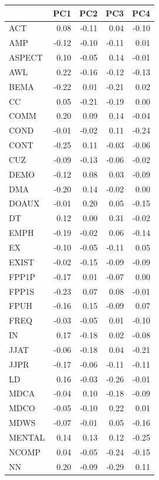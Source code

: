 \documentclass[
  letterpaper,
  DIV=11,
  numbers=noendperiod]{scrreprt}
\begin{document}
\begin{longtable}[]{@{}lrrrr@{}}
\toprule\noalign{}
& PC1 & PC2 & PC3 & PC4 \\
\midrule\noalign{}
\endhead
\bottomrule\noalign{}
\endlastfoot
ACT & 0.08 & -0.11 & 0.04 & -0.10 \\
AMP & -0.12 & -0.10 & -0.11 & 0.01 \\
ASPECT & 0.10 & -0.05 & 0.14 & -0.01 \\
AWL & 0.22 & -0.16 & -0.12 & -0.13 \\
BEMA & -0.22 & 0.01 & -0.21 & 0.02 \\
CC & 0.05 & -0.21 & -0.19 & 0.00 \\
COMM & 0.20 & 0.09 & 0.14 & -0.04 \\
COND & -0.01 & -0.02 & 0.11 & -0.24 \\
CONT & -0.25 & 0.11 & -0.03 & -0.06 \\
CUZ & -0.09 & -0.13 & -0.06 & -0.02 \\
DEMO & -0.12 & 0.08 & 0.03 & -0.09 \\
DMA & -0.20 & 0.14 & -0.02 & 0.00 \\
DOAUX & -0.01 & 0.20 & 0.05 & -0.15 \\
DT & 0.12 & 0.00 & 0.31 & -0.02 \\
EMPH & -0.19 & -0.02 & 0.06 & -0.14 \\
EX & -0.10 & -0.05 & -0.11 & 0.05 \\
EXIST & -0.02 & -0.15 & -0.09 & -0.09 \\
FPP1P & -0.17 & 0.01 & -0.07 & 0.00 \\
FPP1S & -0.23 & 0.07 & 0.08 & -0.01 \\
FPUH & -0.16 & 0.15 & -0.09 & 0.07 \\
FREQ & -0.03 & -0.05 & 0.01 & -0.10 \\
IN & 0.17 & -0.18 & 0.02 & -0.08 \\
JJAT & -0.06 & -0.18 & 0.04 & -0.21 \\
JJPR & -0.17 & -0.06 & -0.11 & -0.11 \\
LD & 0.16 & -0.03 & -0.26 & -0.01 \\
MDCA & -0.04 & 0.10 & -0.18 & -0.09 \\
MDCO & -0.05 & -0.10 & 0.22 & 0.01 \\
MDWS & -0.07 & -0.01 & 0.05 & -0.16 \\
MENTAL & 0.14 & 0.13 & 0.12 & -0.25 \\
NCOMP & 0.04 & -0.05 & -0.24 & -0.15 \\
NN & 0.20 & -0.09 & -0.29 & 0.11 \\

\end{longtable}
\end{document}
